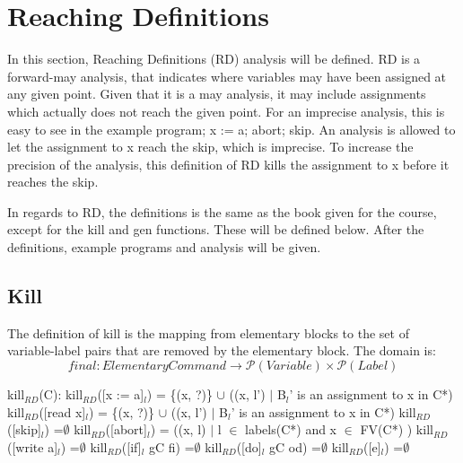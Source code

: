
\section{Reaching Definitions}

In this section, Reaching Definitions (RD) analysis will be defined.
RD is a forward-may analysis, that indicates where variables may have
been assigned at any given point. Given that it is a may analysis,
it may include assignments which actually does not reach the given point.
For an imprecise analysis, this is easy to see in the example program;
x := a; abort; skip. An analysis is allowed to let the assignment to x
reach the skip, which is imprecise. To increase the precision of the analysis,
this definition of RD kills the assignment to x before it reaches the skip.

In regards to RD, the definitions is the same as the book given for the course,
except for the kill and gen functions. These will be defined below.
After the definitions, example programs and analysis will be given.

\subsection{Kill}

The definition of kill is the mapping from elementary blocks to the set of variable-label pairs
that are removed by the elementary block. The domain is:
\[final \colon Elementary Command \to \mathcal{P}(Variable)\times\mathcal{P}(Label)\]

kill$_{RD}$(C):\newline
kill$_{RD}$([x := a]$_l$)           = \{(x, ?)\} $\cup$ ((x, l') $\vert$ B$_l$' is an assignment to x in C*)\newline
kill$_{RD}$([read x]$_l$)           = \{(x, ?)\} $\cup$ ((x, l') $\vert$ B$_l$' is an assignment to x in C*)\newline
kill$_{RD}$([skip]$_l$)             =$\emptyset$\newline
kill$_{RD}$([abort]$_l$) 			= ((x, l) $\vert$ l $\in$ labels(C*) and x $\in$ FV(C*) )\newline
kill$_{RD}$([write a]$_l$)          =$\emptyset$\newline
kill$_{RD}$([if]$_l$ gC fi)         =$\emptyset$\newline
kill$_{RD}$([do]$_l$ gC od)         =$\emptyset$\newline
kill$_{RD}$([e]$_l$)                =$\emptyset$\newline

